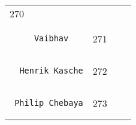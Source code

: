\documentclass[]{article}
\begin{document}
\begin{longtable}[c]{@{}llll@{}}
\begin{minipage}[t]{0.10\columnwidth}
270
\end{minipage} & \begin{minipage}[t]{0.13\columnwidth}\raggedright
\end{minipage} & \begin{minipage}[t]{0.15\columnwidth}\raggedright
\end{minipage}
\\\noalign{\medskip}
\begin{minipage}[t]{0.39\columnwidth}\raggedright
\begin{verbatim}
     Vaibhav
\end{verbatim}
\end{minipage} & \begin{minipage}[t]{0.10\columnwidth}\raggedright
271
\end{minipage} & \begin{minipage}[t]{0.13\columnwidth}\raggedright
\end{minipage} & \begin{minipage}[t]{0.15\columnwidth}\raggedright
\end{minipage}
\\\noalign{\medskip}
\begin{minipage}[t]{0.39\columnwidth}\raggedright
\begin{verbatim}
  Henrik Kasche
\end{verbatim}
\end{minipage} & \begin{minipage}[t]{0.10\columnwidth}\raggedright
272
\end{minipage} & \begin{minipage}[t]{0.13\columnwidth}\raggedright
\end{minipage} & \begin{minipage}[t]{0.15\columnwidth}\raggedright
\end{minipage}
\\\noalign{\medskip}
\begin{minipage}[t]{0.39\columnwidth}\raggedright
\begin{verbatim}
 Philip Chebaya
\end{verbatim}
\end{minipage} & \begin{minipage}[t]{0.10\columnwidth}\raggedright
273
\end{minipage} & \begin{minipage}[t]{0.13\columnwidth}\raggedright
\end{minipage} & \begin{minipage}[t]{0.15\columnwidth}\raggedright

\end{minipage}
\end{longtable}
\end{document}

